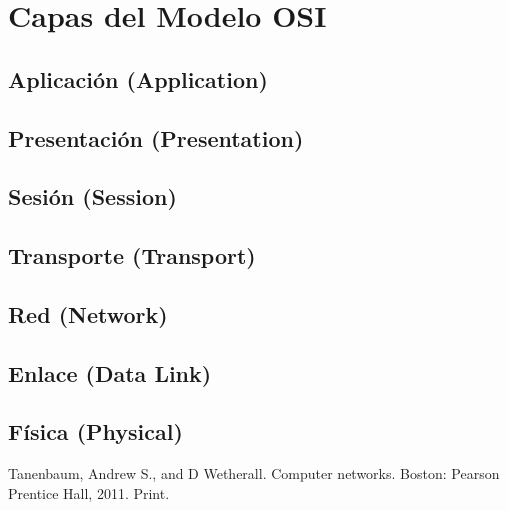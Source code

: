 \section{Capas del Modelo OSI}
\subsection{Aplicación (Application)}
\subsection{Presentación (Presentation)}
\subsection{Sesión (Session)}
\subsection{Transporte (Transport)}
\subsection{Red (Network)}
\subsection{Enlace (Data Link)}
\subsection{Física (Physical)}

\begin{thebibliography}{9}
Tanenbaum, Andrew S., and D Wetherall. Computer networks. Boston: Pearson Prentice Hall, 2011. Print.

\end{thebibliography}

